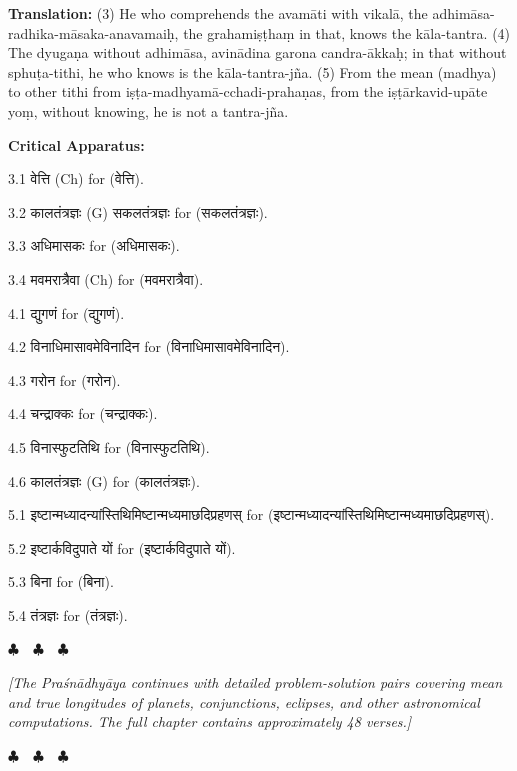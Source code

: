 \documentclass[11pt,a4paper]{article}
\newcommand{\dev}[1]{{\devanagarifont #1}}
\newenvironment{variants}{%
  \small%
  \color{varecolor}%
  \list{}{\leftmargin=2em\itemindent=-1em}%
}{\endlist}
\newcommand{\chapterend}{%
  \begin{center}%
  \textcolor{endmarkcolor}{$\clubsuit$~~$\clubsuit$~~$\clubsuit$}%
  \end{center}%
}
\begin{document}
\textbf{Translation:} (3) He who comprehends the avamāti with vikalā, the 
adhimāsa-radhika-māsaka-anavamaiḥ, the grahamiṣṭhaṃ in that, knows the kāla-tantra. 
(4) The dyugaṇa without adhimāsa, avinādina garona candra-ākkaḥ; in that without 
sphuṭa-tithi, he who knows is the kāla-tantra-jña. (5) From the mean (madhya) 
to other tithi from iṣṭa-madhyamā-cchadi-prahaṇas, from the iṣṭārkavid-upāte 
yoṃ, without knowing, he is not a tantra-jña.

\textcolor{varecolor}{\textbf{Critical Apparatus:}}
\begin{variants}
\item[3.1] \dev{वेत्ति} (Ch) \dev{for} (\dev{वेत्ति}).
\item[3.2] \dev{कालतंत्रज्ञः} (G) \dev{सकलतंत्रज्ञः} \dev{for} (\dev{सकलतंत्रज्ञः}).
\item[3.3] \dev{अधिमासकः} \dev{for} (\dev{अधिमासकः}).
\item[3.4] \dev{मवमरात्रैवा} (Ch) \dev{for} (\dev{मवमरात्रैवा}).
\item[4.1] \dev{द्युगणं} \dev{for} (\dev{द्युगणं}).
\item[4.2] \dev{विनाधिमासावमेविनादिन} \dev{for} (\dev{विनाधिमासावमेविनादिन}).
\item[4.3] \dev{गरोन} \dev{for} (\dev{गरोन}).
\item[4.4] \dev{चन्द्राक्कः} \dev{for} (\dev{चन्द्राक्कः}).
\item[4.5] \dev{विनास्फुटतिथि} \dev{for} (\dev{विनास्फुटतिथि}).
\item[4.6] \dev{कालतंत्रज्ञः} (G) \dev{for} (\dev{कालतंत्रज्ञः}).
\item[5.1] \dev{इष्टान्मध्यादन्यांस्तिथिमिष्टान्मध्यमाछदिप्रहणस्} \dev{for} (\dev{इष्टान्मध्यादन्यांस्तिथिमिष्टान्मध्यमाछदिप्रहणस्}).
\item[5.2] \dev{इष्टार्कविदुपाते यों} \dev{for} (\dev{इष्टार्कविदुपाते यों}).
\item[5.3] \dev{बिना} \dev{for} (\dev{बिना}).
\item[5.4] \dev{तंत्रज्ञः} \dev{for} (\dev{तंत्रज्ञः}).
\end{variants}

\vspace{0.5cm}
\chapterend
\textit{[The Praśnādhyāya continues with detailed problem-solution pairs covering 
mean and true longitudes of planets, conjunctions, eclipses, and other 
astronomical computations. The full chapter contains approximately 48 verses.]}
\chapterend

\newpage

\end{document}
